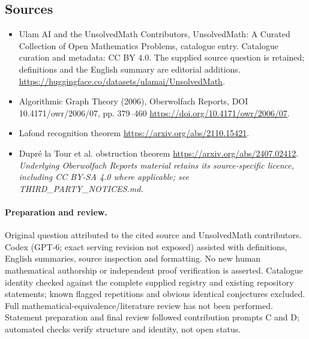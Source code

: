 \documentclass[11pt]{article}
\begin{document}
\subsection{Sources}
\begin{itemize}
\item[\hypertarget{source:statement:1}{S1}] Ulam AI and the UnsolvedMath Contributors, UnsolvedMath: A Curated Collection of Open Mathematics Problems, catalogue entry. Catalogue curation and metadata: CC BY 4.0. The supplied source question is retained; definitions and the English summary are editorial additions.
\url{https://huggingface.co/datasets/ulamai/UnsolvedMath}.
\item[\hypertarget{source:statement:2}{S2}] Algorithmic Graph Theory (2006), Oberwolfach Reports, DOI 10.4171/owr/2006/07, pp. 379--460
\url{https://doi.org/10.4171/owr/2006/07}.
\item[\hypertarget{source:statement:3}{S3}] Lafond recognition theorem
\url{https://arxiv.org/abs/2110.15421}.
\item[\hypertarget{source:statement:4}{S4}] Dupré la Tour et al. obstruction theorem
\url{https://arxiv.org/abs/2407.02412}.
\textit{Underlying Oberwolfach Reports material retains its source-specific licence, including CC BY-SA 4.0 where applicable; see THIRD\_PARTY\_NOTICES.md.}
\end{itemize}
\paragraph{Preparation and review.}
Original question attributed to the cited source and UnsolvedMath contributors. Codex (GPT-6; exact serving revision not exposed) assisted with definitions, English summaries, source inspection and formatting. No new human mathematical authorship or independent proof verification is asserted. Catalogue identity checked against the complete supplied registry and existing repository statements; known flagged repetitions and obvious identical conjectures excluded. Full mathematical-equivalence/literature review has not been performed. Statement preparation and final review followed contribution prompts C and D; automated checks verify structure and identity, not open status.
\label{end:statement}
\end{document}
